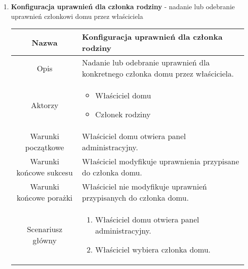 \documentclass{article}
\begin{document}
\begin{enumerate}
\begin{enumerate}
			\item \textbf{Konfiguracja uprawnień dla członka rodziny} - nadanie lub
				odebranie uprawnień członkowi domu przez właściciela
				\begin{table}[H]
					\centering
					\begin{tabular}{|c|p{7cm}|}
						\hline
						Nazwa                   & \textbf{Konfiguracja uprawnień dla członka rodziny}                                                                                                                                               \\
						\hline
						Opis                    & Nadanie lub odebranie uprawnień dla konkretnego członka domu przez właściciela.                                                                                                                   \\
						\hline
						Aktorzy                 & \begin{itemize}\item Właściciel domu

\item Członek rodziny\end{itemize}                                                                                                                          \\
						\hline
						Warunki początkowe      & Właściciel domu otwiera panel administracyjny.                                                                                                                                                    \\
						\hline
						Warunki końcowe sukcesu & Właściciel modyfikuje uprawnienia przypisane do członka domu.                                                                                                                                     \\
						\hline
						Warunki końcowe porażki & Właściciel nie modyfikuje uprawnień przypisanych do członka domu.                                                                                                                                 \\
						\hline
						Scenariusz główny       & \begin{enumerate}\item Właściciel domu otwiera panel administracyjny.

\item Właściciel wybiera członka domu.


\end{enumerate}
\end{tabular}
\end{table}
\end{enumerate}
\end{enumerate}
\end{document}
